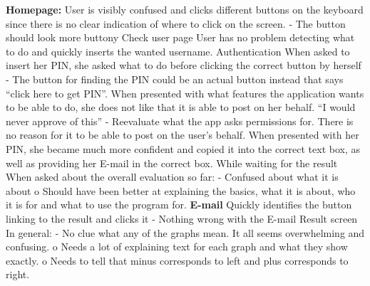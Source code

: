 \textbf{Homepage:}
User is visibly confused and clicks different buttons on the keyboard since there is no clear indication of where to click on the screen.
-	The button should look more buttony
Check user page
User has no problem detecting what to do and quickly inserts the wanted username.
Authentication
When asked to insert her PIN, she asked what to do before clicking the correct button by herself
-	The button for finding the PIN could be an actual button instead that says “click here to get PIN”.
When presented with what features the application wants to be able to do, she does not like that it is able to post on her behalf. “I would never approve of this”
-	Reevaluate what the app asks permissions for. There is no reason for it to be able to post on the user’s behalf.
When presented with her PIN, she became much more confident and copied it into the correct text box, as well as providing her E-mail in the correct box.
While waiting for the result
When asked about the overall evaluation so far:
-	Confused about what it is about
	o	Should have been better at explaining the basics, what it is about, who it is
	    for and what to use the program for.
\textbf{E-mail}
Quickly identifies the button linking to the result and clicks it
-	Nothing wrong with the E-mail
Result screen
In general:
-	No clue what any of the graphs mean. It all seems overwhelming and confusing.
	o	Needs a lot of explaining text for each graph and what they show exactly. 
	o	Needs to tell that minus corresponds to left and plus corresponds to right.
	
